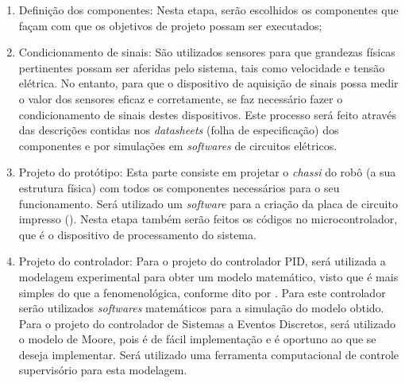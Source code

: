 \begin{enumerate}

 \item Definição dos componentes: %
Nesta etapa, serão escolhidos os componentes que façam com que os objetivos de projeto possam ser executados;

 \item Condicionamento de sinais: São utilizados sensores para que grandezas físicas pertinentes possam ser aferidas pelo sistema, 
 tais como velocidade e tensão elétrica. No entanto, para que o dispositivo de aquisição de sinais possa medir 
 o valor dos sensores eficaz e corretamente, se faz necessário fazer o condicionamento de sinais destes dispositivos. Este 
 processo será feito através das descrições contidas nos \textit{datasheets} (folha de especificação) dos componentes e por 
 simulações em \textit{softwares} de circuitos elétricos.
 
 
 \item Projeto do protótipo: Esta parte consiste em projetar o \textit{chassi} do robô (a sua estrutura física) com todos os componentes 
 necessários para o seu funcionamento. Será utilizado um \textit{software} 
  para a criação da placa de circuito impresso 
 (). Nesta etapa também serão feitos os códigos no microcontrolador, que é o dispositivo 
 de processamento do sistema.
 
 \item Projeto do controlador: Para o projeto do controlador PID, será utilizada a modelagem experimental 
 para obter um modelo matemático, visto que é mais simples do que a fenomenológica, conforme dito por . Para este 
 controlador serão utilizados \textit{softwares} matemáticos para a simulação do modelo obtido. Para o projeto do controlador 
 de Sistemas a Eventos Discretos, será utilizado o modelo de Moore, pois é de fácil implementação e é oportuno ao que se deseja 
 implementar. Será utilizado uma ferramenta	 computacional de controle supervisório para esta modelagem.
 

\end{enumerate}
